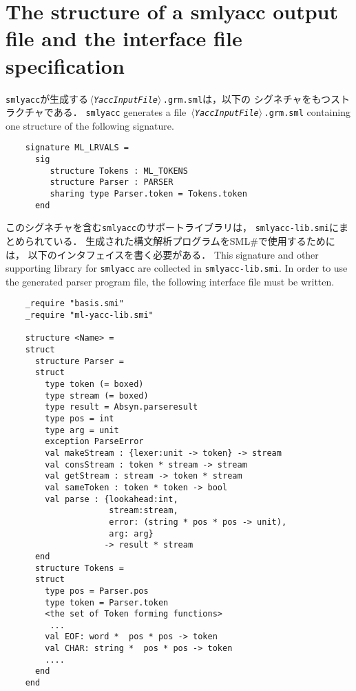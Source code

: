 \documentclass{jbook}
\newcommand{\txt}[2]{#2}
\newcommand{\smlsharp}{SML\#}
\newcommand{\code}[1]{\mbox{\large\tt #1}}
\newcommand{\nonterm}[1]{\mbox{$\,\langle$}{\it #1}\mbox{$\rangle\,$}}
\begin{document}
\section{\txt{smlyacc出力ファイルの構造とインタフェイスファル記述}{The
structure of a smlyacc output file and the interface file specification}}

\ifjp%
	\code{smlyacc}が生成する\code{\nonterm{YaccInputFile}.grm.sml}は，以下の
シグネチャをもつストラクチャである．
\else%
	\code{smlyacc} generates a file
\code{\nonterm{YaccInputFile}.grm.sml} containing one structure of the
following signature.
\fi%

\begin{verbatim}
    signature ML_LRVALS =
      sig
         structure Tokens : ML_TOKENS
         structure Parser : PARSER
         sharing type Parser.token = Tokens.token
      end
\end{verbatim}	

\ifjp%
	このシグネチャを含む\code{smlyacc}のサポートライブラリは，
\code{smlyacc-lib.smi}にまとめられている．
	生成された構文解析プログラムを\smlsharp{}で使用するためには，
以下のインタフェイスを書く必要がある．
\else%
	This signature and other supporting library for \code{smlyacc}
are collected in \code{smlyacc-lib.smi}.
	In order to use the generated parser program file, the following
interface file must be written.
\fi%

\begin{verbatim}
    _require "basis.smi"
    _require "ml-yacc-lib.smi"
    
    structure <Name> =
    struct
      structure Parser =
      struct
        type token (= boxed)
        type stream (= boxed)
        type result = Absyn.parseresult
        type pos = int
        type arg = unit
        exception ParseError
        val makeStream : {lexer:unit -> token} -> stream
        val consStream : token * stream -> stream
        val getStream : stream -> token * stream
        val sameToken : token * token -> bool
        val parse : {lookahead:int,
                     stream:stream,
                     error: (string * pos * pos -> unit),
                     arg: arg}
                    -> result * stream
      end
      structure Tokens =
      struct
        type pos = Parser.pos
        type token = Parser.token
        <the set of Token forming functions>
         ...
        val EOF: word *  pos * pos -> token
        val CHAR: string *  pos * pos -> token
        ....
      end
    end
\end{verbatim}
\end{document}
